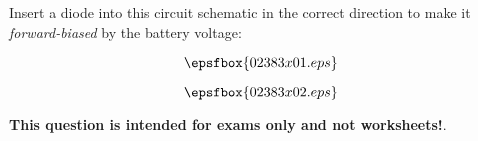 

Insert a diode into this circuit schematic in the correct direction to make it {\it forward-biased} by the battery voltage:

$$\epsfbox{02383x01.eps}$$







$$\epsfbox{02383x02.eps}$$







{\bf This question is intended for exams only and not worksheets!}.





